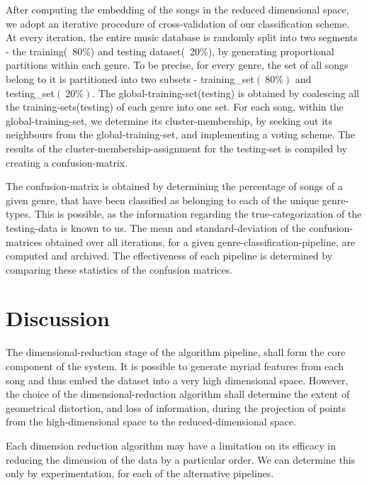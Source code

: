 \documentclass[12pt]{article}
\begin{document}
After computing the embedding of the songs in the reduced dimensional space, we adopt an iterative procedure of cross-validation of our classification scheme. At every iteration, the entire music database is randomly split into two segments - the training(~80\%) and testing dataset(~20\%), by generating proportional partitions within each genre.
To be precise, for every genre, the set of all songs belong to it is partitioned into two subsets - training_set$(~80\%)$ and testing_set$(~20\%)$. The global-training-set(testing) is obtained by coalescing all the training-sets(testing) of each genre into one set. For each song, within the global-training-set, we determine its cluster-membership, by seeking out its neighbours from the global-training-set, and implementing a voting scheme. The results of the cluster-membership-assignment for the testing-set is compiled by creating a confusion-matrix. 

The confusion-matrix is obtained by determining the percentage of songs of a given genre, that have been classified as belonging to each of the unique genre-types. This is possible, as the information regarding the true-categorization of the testing-data is known to us.   The mean and standard-deviation of the confusion-matrices obtained over all iterations, for a given genre-classification-pipeline, are computed and archived. The effectiveness of each pipeline is determined by comparing these statistics of the confusion matrices. 

\section{Discussion}

The dimensional-reduction stage of the algorithm pipeline, shall form the core component of the system. It is possible to generate myriad features from each song and thus embed the dataset into a very high dimensional space. However, the choice of the dimensional-reduction algorithm shall determine the extent of geometrical distortion, and loss of information, during the projection of points from the high-dimensional space to the reduced-dimensional space. 

Each dimension reduction algorithm may have a limitation on its efficacy in reducing the dimension of the data by a particular order. We can determine this only by experimentation, for each of the alternative pipelines. 
\end{document}

